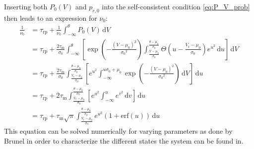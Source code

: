 Inserting both $P_0(V)$ and $p_{r, 0}$ into the self-consistent condition \eqref{eq:P_V_prob}
then leads to an expression for $\nu_0$:
\begin{equation}
    \begin{split}
        \frac{1}{\nu_0} 	
            &= \tau_\text{rp} + \frac{1}{\nu_0} \int_{-\infty}^{\theta} \! P_0(V) \, \text{d}V  \\ 
            &= \tau_\text{rp} + \frac{2 \tau_\text{m}}{\sigma_0} 
                \int_{-\infty}^{\theta} \! \left[ 
                    \exp{\left(- \frac{(V - \mu_0)^2}{{\sigma_0}^2} \right)}
                    \int_{\frac{V - \mu_0}{\sigma_0}}^{\frac{\theta - \mu_0}{\sigma_0}} \! 
                        \Theta \left(u - \frac{V_\text{r} - \mu_0}{\sigma_0} \right) e^{u^2} \, \text{d}u 
                    \right] \, \text{d}V  \\ 
            &= \tau_\text{rp} + \frac{2 \tau_\text{m}}{\sigma_0} 
                \int_{\frac{V_\text{r} - \mu_0}{\sigma_0}}^{\frac{\theta - \mu_0}{\sigma_0}} \! 
                    \left[ 
                        e^{u^2}
                        \int_{-\infty}^{u \sigma_0 + \mu_0} \! 
                        \exp{\left(- \frac{(V - \mu_0)^2}{{\sigma_0}^2} \right)}
                        \, \text{d}V
                    \right] \, \text{d}u  \\ 
            &= \tau_\text{rp} + 2 \tau_\text{m}
                \int_{\frac{V_\text{r} - \mu_0}{\sigma_0}}^{\frac{\theta - \mu_0}{\sigma_0}} \! 
                    \left[ 
                        e^{u^2}
                        \int_{-\infty}^{u} \! e^{v^2} \, \text{d}v
                    \right] \, \text{d}u  \\ 
            &= \tau_\text{rp} + \tau_\text{m} \sqrt{\pi}
                \int_{\frac{V_\text{r} - \mu_0}{\sigma_0}}^{\frac{\theta - \mu_0}{\sigma_0}} \! 
                e^{u^2} \left(1 + \text{erf}(u)\right)
                \, \text{d}u  
        \label{eq:self_consistency}
    \end{split}
\end{equation}
This equation can be solved numerically for varying parameters as done by Brunel in order to 
characterize the different states the system can be found in. 


